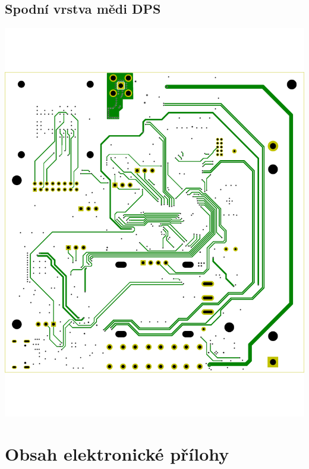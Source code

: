 \section{Spodní vrstva mědi DPS} \label{BottomApp}
\includegraphics[width=\textwidth]{KiCad/boardB}


\chapter{Obsah elektronické přílohy}

